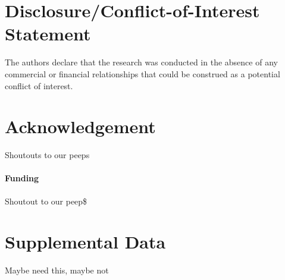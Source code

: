 \documentclass{frontiersSCNS} %
\begin{document}
\section*{Disclosure/Conflict-of-Interest Statement}
The authors declare that the research was conducted in the absence of any commercial or financial relationships that could be construed as a potential conflict of interest.

\section*{Acknowledgement}
Shoutouts to our peeps

\paragraph{Funding\textcolon} Shoutout to our peep\$

\section*{Supplemental Data}
Maybe need this, maybe not






\end{document}
